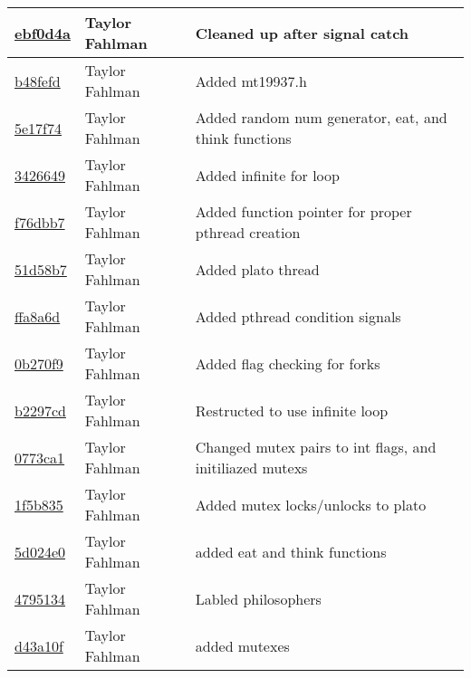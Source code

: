 \begin{tabular}{l l l}
\href{git@github.com:fahlmant/cs444/commit/ebf0d4a0840a6a6bb8b17916dc160c469197593d}{ebf0d4a} & Taylor Fahlman & Cleaned up after signal catch\\\hline
\href{git@github.com:fahlmant/cs444/commit/b48fefd146280d909c6cf2155b3fe1fdec0a3974}{b48fefd} & Taylor Fahlman & Added mt19937.h\\\hline
\href{git@github.com:fahlmant/cs444/commit/5e17f747c9f116ab75a330d8ce0bfdb3f3ec35ab}{5e17f74} & Taylor Fahlman & Added random num generator, eat, and think functions\\\hline
\href{git@github.com:fahlmant/cs444/commit/3426649ae1918162e2ffc19e8b76ffebcbfeafb6}{3426649} & Taylor Fahlman & Added infinite for loop\\\hline
\href{git@github.com:fahlmant/cs444/commit/f76dbb79c66c9c07cf4077e12042e9a2e0fd820f}{f76dbb7} & Taylor Fahlman & Added function pointer for proper pthread creation\\\hline
\href{git@github.com:fahlmant/cs444/commit/51d58b7179ad83063834c6bf5eac684dbe2dcea1}{51d58b7} & Taylor Fahlman & Added plato thread\\\hline
\href{git@github.com:fahlmant/cs444/commit/ffa8a6dcce81ffcaa6b0953ac7e66c13a5eebf23}{ffa8a6d} & Taylor Fahlman & Added pthread condition signals\\\hline
\href{git@github.com:fahlmant/cs444/commit/0b270f9d732ab6a652aaba7f6947f13c0e9cdc46}{0b270f9} & Taylor Fahlman & Added flag checking for forks\\\hline
\href{git@github.com:fahlmant/cs444/commit/b2297cd2ec70c735e39a1cc26d5ff39478f011bf}{b2297cd} & Taylor Fahlman & Restructed to use infinite loop\\\hline
\href{git@github.com:fahlmant/cs444/commit/0773ca18437eb1aff2874e73ff18fe67681602dc}{0773ca1} & Taylor Fahlman & Changed mutex pairs to int flags, and initiliazed mutexs\\\hline
\href{git@github.com:fahlmant/cs444/commit/1f5b835fc8b41d44ee33a2f2e6f5ec916591957a}{1f5b835} & Taylor Fahlman & Added mutex locks/unlocks to plato\\\hline
\href{git@github.com:fahlmant/cs444/commit/5d024e0d8a49d0db3b239929402e049376df57e1}{5d024e0} & Taylor Fahlman & added eat and think functions\\\hline
\href{git@github.com:fahlmant/cs444/commit/4795134ae4187793f395617ba52841d7c9e7f6d1}{4795134} & Taylor Fahlman & Labled philosophers\\\hline
\href{git@github.com:fahlmant/cs444/commit/d43a10f1ac0ff2b53122ca42969b95d5e5b474b9}{d43a10f} & Taylor Fahlman & added mutexes\\\hline

\end{tabular}
